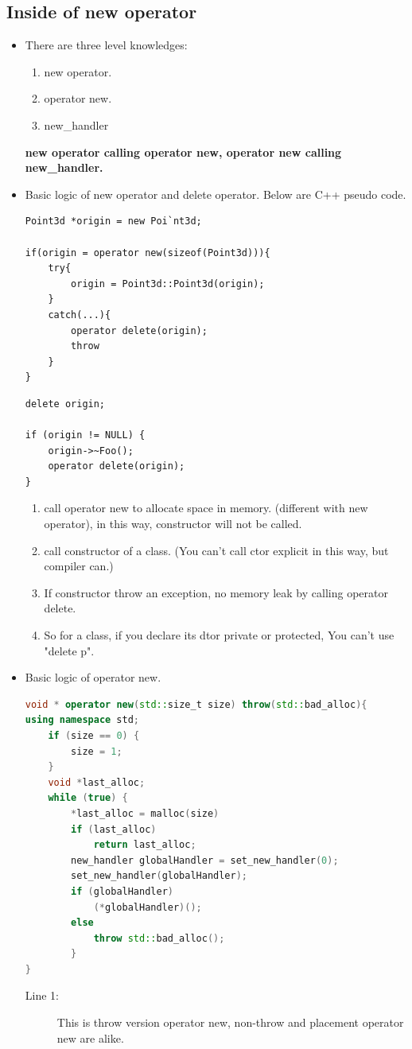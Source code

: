 \documentclass[a4paper,11pt,twoside]{book}
\begin{document}
\subsection{Inside of new operator}
\begin{itemize}
	\item There are three level knowledges: 
	\begin{enumerate}
		\item new operator.
		\item operator new.
		\item new\_handler
	\end{enumerate}
	\textbf{new operator calling operator new, operator new calling new\_handler.} 
	
	\item Basic logic of new operator and delete operator. Below are C++ pseudo code.
\begin{lstlisting}[numbers=none]
Point3d *origin = new Poi`nt3d;
	
if(origin = operator new(sizeof(Point3d))){
	try{
		origin = Point3d::Point3d(origin);
	}
	catch(...){
		operator delete(origin);
		throw
	}
}
\end{lstlisting}
	
\begin{lstlisting}[numbers=none]
delete origin;
	
if (origin != NULL) {
	origin->~Foo();
	operator delete(origin);
}
\end{lstlisting}
	
	\begin{enumerate}
		\item call operator new to allocate space in memory. (different with new operator), in this way, constructor will not be called.
		\item call constructor of a class. (You can't call ctor explicit in this way, but compiler can.)
		\item If constructor throw an exception, no memory leak by calling operator delete.
		
		\item So for a class, if you declare its dtor private or protected, You can't use "delete p".
	\end{enumerate}
	
	
\item Basic logic of operator new.
\begin{lstlisting}[frame=single, language=c++]
void * operator new(std::size_t size) throw(std::bad_alloc){
using namespace std; 
	if (size == 0) {   
		size = 1;             
	}                 
	void *last_alloc;
	while (true) {
		*last_alloc = malloc(size)
		if (last_alloc)
			return last_alloc;
		new_handler globalHandler = set_new_handler(0);
		set_new_handler(globalHandler);
		if (globalHandler) 
			(*globalHandler)();
		else 
			throw std::bad_alloc();
		}
}
	\end{lstlisting}
\begin{description}
	\item[Line 1:] This is throw version operator new, non-throw and placement operator new are alike. 
	

\end{description}
\end{itemize}
\end{document}
